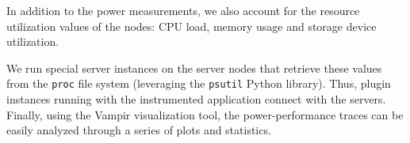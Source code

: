 In  addition  to the  power  measurements,  we  also account  for  the
resource utilization values  of the nodes: CPU load,  memory usage and
storage device utilization. %

We  run special  \pmlib  server  instances on  the  server nodes  that
retrieve these  values from the \texttt{proc}  file system (leveraging
the  \texttt{psutil} Python library).   Thus, \pmlib  plugin instances
running  with the  instrumented  application connect  with the  \pmlib
servers.   Finally,   using  the   Vampir   visualization  tool,   the
power-performance traces  can be easily  analyzed through a  series of
plots and statistics.
